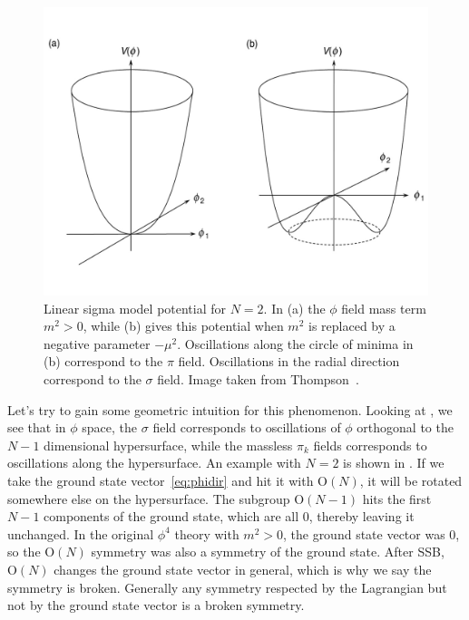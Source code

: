 \begin{figure}[t]
\centering
\includegraphics[width=0.8\linewidth]{figs/symm_break.pdf}
\caption{Linear sigma model potential for $N=2$. In (a) the $\phi$ field
         mass term $m^2>0$, while (b) gives this potential when
         $m^2$ is replaced by a negative parameter $-\mu^2$.
         Oscillations along the circle of minima in (b) correspond to 
         the $\pi$ field. Oscillations in the radial direction correspond
         to the $\sigma$ field. Image taken from 
         Thompson~\cite{thomson_modern_2013}.}
\label{fig:ssb}
\end{figure}

Let's try to gain some geometric intuition for this phenomenon. 
Looking at , we see that in $\phi$ space, the $\sigma$
field corresponds to oscillations of $\phi$ orthogonal to the $N-1$
dimensional hypersurface, while the massless $\pi_k$ fields
corresponds to oscillations along the hypersurface. 
An example with $N=2$ is shown in . 
If we take the ground state vector~\eqref{eq:phidir} and hit it with
$\text{O}(N)$, it will be rotated somewhere else on the hypersurface.
The subgroup $\text{O}(N-1)$ hits the first $N-1$ components of the
ground state, which are all 0, thereby leaving it unchanged.
In the original $\phi^4$ theory with
$m^2>0$, the ground state vector was 0, so the $\text{O}(N)$ symmetry
was also a symmetry of the ground state. After SSB, $\text{O}(N)$ changes 
the ground state vector in general,
which is why we say the symmetry is broken. Generally any symmetry
respected by the Lagrangian but not by the ground state vector
is a broken symmetry.

